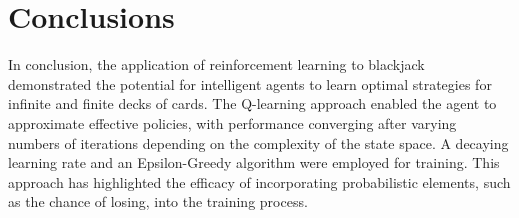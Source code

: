 \section{Conclusions}




In conclusion, the application of reinforcement learning to blackjack demonstrated the potential for intelligent agents to learn optimal strategies for infinite and finite decks of cards. The Q-learning approach enabled the agent to approximate effective policies, with performance converging after varying numbers of iterations depending on the complexity of the state space. A decaying learning rate and an Epsilon-Greedy algorithm were employed for training. This approach has highlighted the efficacy of incorporating probabilistic elements, such as the chance of losing, into the training process.
